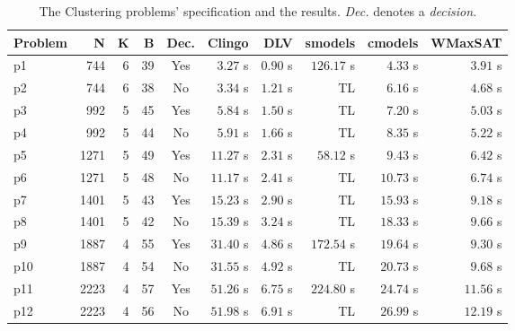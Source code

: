 \documentclass[]{article}
\begin{document}
\begin{table}[h]
\caption{The Clustering problems' specification and the results. \textit{Dec.} denotes a \textit{decision}.}
\label{tab:clustering_results}
\vspace{1em}
\scriptsize
\begin{tabular}{lrrrcrrrrr}
\toprule
Problem & N & K & B & Dec. & Clingo & DLV & smodels & cmodels & WMaxSAT \\
\midrule
p1 & 744 & 6 & 39 & Yes  & $  3.27 $ s   & $ 0.90 $ s    & $ 126.17 $ s  & $ 4.33 $ s    & $ 3.91 $ s \\
p2 & 744 & 6 & 38 & No   & $ 3.34 $ s    & $ 1.21 $ s    & TL            & $ 6.16 $ s    & $ 4.68 $ s \\
p3 & 992 & 5 & 45 & Yes  & $ 5.84 $ s    & $ 1.50 $ s    & TL            & $ 7.20 $ s    & $ 5.03 $ s \\
p4 & 992 & 5 & 44 & No   & $ 5.91 $ s    & $ 1.66 $ s    & TL            & $ 8.35 $ s    & $ 5.22 $ s \\
p5 & 1271 & 5 & 49 & Yes & $ 11.27 $ s   & $ 2.31 $ s    & $ 58.12 $ s   & $ 9.43 $ s    & $ 6.42 $ s \\
p6 & 1271 & 5 & 48 & No  & $ 11.17 $ s   & $ 2.41 $ s    & TL            & $ 10.73 $ s   & $ 6.74 $ s \\
p7 & 1401 & 5 & 43 & Yes & $ 15.23 $ s   & $ 2.90 $ s    & TL            & $ 15.93 $ s   & $ 9.18 $ s \\
p8 & 1401 & 5 & 42 & No  & $ 15.39 $ s   & $ 3.24 $ s    & TL            & $ 18.33 $ s   & $ 9.66 $ s \\
p9 & 1887 & 4 & 55 & Yes & $ 31.40 $ s   & $ 4.86 $ s    & $ 172.54 $ s  & $ 19.64 $ s   & $ 9.30 $ s \\
p10 & 1887 & 4 & 54 & No  & $ 31.55 $ s   & $ 4.92 $ s    & TL            & $ 20.73 $ s   & $ 9.68 $ s \\
p11 & 2223 & 4 & 57 & Yes & $ 51.26 $ s   & $ 6.75 $ s    & $ 224.80 $ s  & $ 24.74 $ s   & $ 11.56 $ s \\
p12 & 2223 & 4 & 56 & No  & $ 51.98 $ s   & $ 6.91 $ s    & TL            & $ 26.99 $ s   & $ 12.19 $ s \\
\bottomrule
\end{tabular}
\end{table}



\end{document}
